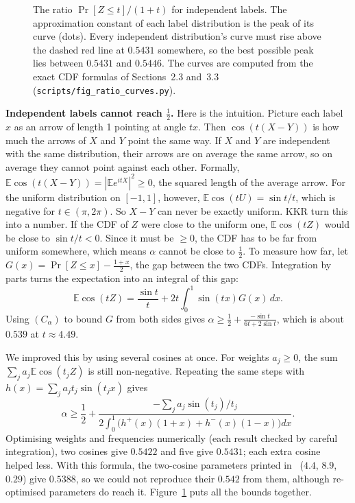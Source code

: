 \documentclass[sigconf,nonacm]{acmart}
\newcommand{\E}{\mathbb{E}}
\begin{document}
\begin{figure}[t]
\caption{The ratio $\Pr[Z\le t]/(1+t)$ for independent labels. The approximation constant of each label distribution is the peak of its curve (dots). Every independent distribution's curve must rise above the dashed red line at $0.5431$ somewhere, so the best possible peak lies between $0.5431$ and $0.5446$. The curves are computed from the exact CDF formulas of Sections~2.3 and~3.3 (\texttt{scripts/fig\_ratio\_curves.py}).}
\label{fig:window}
\end{figure}

 \textbf{Independent labels cannot reach $\frac12$.} Here is the intuition. Picture each label $x$ as an arrow of length 1 pointing at angle $tx$. Then $\cos(t(X-Y))$ is how much the arrows of $X$ and $Y$ point the same way. If $X$ and $Y$ are independent with the same distribution, their arrows are on average the same arrow, so on average they cannot point against each other. Formally, $\E\cos(t(X-Y))=|\E e^{itX}|^2\ge0$, the squared length of the average arrow. For the uniform distribution on $[-1,1]$, however, $\E\cos(tU)=\sin t/t$, which is negative for $t\in(\pi,2\pi)$. So $X-Y$ can never be exactly uniform. KKR turn this into a number. If the CDF of $Z$ were close to the uniform one, $\E\cos(tZ)$ would be close to $\sin t/t<0$. Since it must be $\ge0$, the CDF has to be far from uniform somewhere, which means $\alpha$ cannot be close to $\frac12$. To measure how far, let $G(x)=\Pr[Z\le x]-\frac{1+x}2$, the gap between the two CDFs. Integration by parts turns the expectation into an integral of this gap:
\[\textstyle\E\cos(tZ)=\frac{\sin t}t+2t\int_0^1\sin(tx)G(x)\,dx.\]
Using $(C_\alpha)$ to bound $G$ from both sides gives $\alpha\ge\frac12+\frac{-\sin t}{6t+2\sin t}$, which is about $0.539$ at $t\approx4.49$.

 We improved this by using several cosines at once. For weights $a_j\ge0$, the sum $\sum_ja_j\E\cos(t_jZ)$ is still non-negative. Repeating the same steps with $h(x)=\sum_ja_jt_j\sin(t_jx)$ gives
\[\alpha\ge\frac12+\frac{-\sum_ja_j\sin(t_j)/t_j}{2\int_0^1\big(h^+(x)(1+x)+h^-(x)(1-x)\big)dx}.\]
Optimising weights and frequencies numerically (each result checked by careful integration), two cosines give $0.5422$ and five give $0.5431$; each extra cosine helped less. With this formula, the two-cosine parameters printed in~\cite{kkr} ($4.4$, $8.9$, $0.29$) give $0.5388$, so we could not reproduce their $0.542$ from them, although re-optimised parameters do reach it. Figure~\ref{fig:window} puts all the bounds together.
\end{document}
